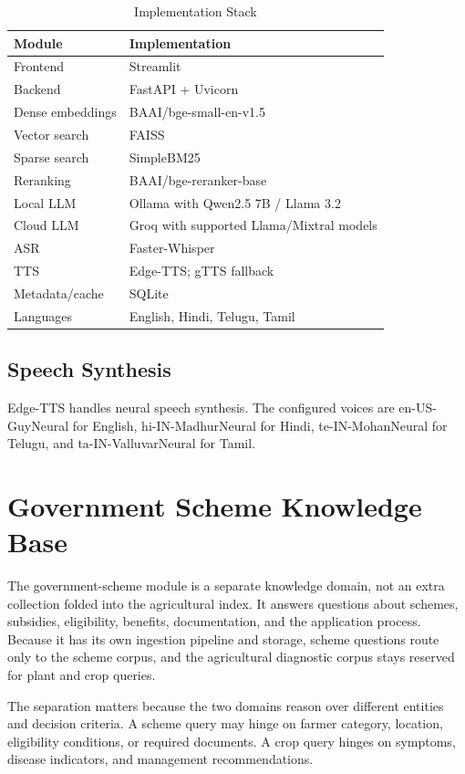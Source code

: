 \documentclass[10pt,twocolumn,letterpaper]{article}
\begin{document}
\begin{table}[t]
\caption{Implementation Stack}
\label{tab:stack}
\centering
\footnotesize
\begin{tabular}{@{}p{2.3cm}p{5.0cm}@{}}
\toprule
\textbf{Module} & \textbf{Implementation} \\
\midrule
Frontend & Streamlit \\
Backend & FastAPI + Uvicorn \\
Dense embeddings & BAAI/bge-small-en-v1.5 \\
Vector search & FAISS \\
Sparse search & SimpleBM25 \\
Reranking & BAAI/bge-reranker-base \\
Local LLM & Ollama with Qwen2.5 7B / Llama 3.2 \\
Cloud LLM & Groq with supported Llama/Mixtral models \\
ASR & Faster-Whisper \\
TTS & Edge-TTS; gTTS fallback \\
Metadata/cache & SQLite \\
Languages & English, Hindi, Telugu, Tamil \\
\bottomrule
\end{tabular}
\end{table}

\subsection{Speech Synthesis}
Edge-TTS handles neural speech synthesis. The configured voices are en-US-GuyNeural for English, hi-IN-MadhurNeural for Hindi, te-IN-MohanNeural for Telugu, and ta-IN-ValluvarNeural for Tamil.

\section{Government Scheme Knowledge Base}
The government-scheme module is a separate knowledge domain, not an extra collection folded into the agricultural index. It answers questions about schemes, subsidies, eligibility, benefits, documentation, and the application process. Because it has its own ingestion pipeline and storage, scheme questions route only to the scheme corpus, and the agricultural diagnostic corpus stays reserved for plant and crop queries.

The separation matters because the two domains reason over different entities and decision criteria. A scheme query may hinge on farmer category, location, eligibility conditions, or required documents. A crop query hinges on symptoms, disease indicators, and management recommendations.
\end{document}
